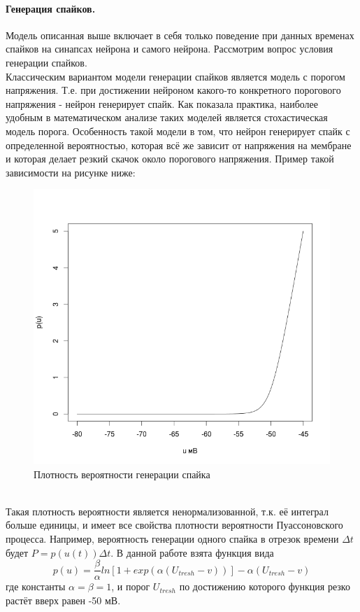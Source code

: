 \documentclass[a4paper,10pt]{article}
\begin{document}
\paragraph*{Генерация спайков.} Модель описанная выше включает в себя только поведение при данных временах спайков на синапсах нейрона и самого нейрона. Рассмотрим вопрос условия генерации спайков.\\
\indent Классическим вариантом модели генерации спайков является модель с порогом напряжения. Т.е. при достижении нейроном какого-то конкретного порогового напряжения - нейрон генерирует спайк. Как показала практика, наиболее удобным в математическом анализе таких моделей является стохастическая модель порога. Особенность такой модели в том, что нейрон генерирует спайк с определенной вероятностью, которая всё же зависит от напряжения на мембране и которая делает резкий скачок около порогового напряжения. Пример такой зависимости на рисунке ниже:
\begin{figure}[ht]\label{pic:p_srm}
\centering
\includegraphics[width=1\linewidth]{p_srm}
\caption{Плотность вероятности генерации спайка}
\end{figure} \\
\indent Такая плотность вероятности является ненормализованной, т.к. её интеграл больше единицы, и имеет все свойства плотности вероятности Пуассоновского процесса. Например, вероятность генерации одного спайка в отрезок времени $\Delta t$ будет $P = p(u(t))\Delta t$. В данной работе взята функция вида
\begin{equation}\label{eq:p_dens}
p(u)=\frac{\beta}{\alpha}ln[1+exp(\alpha(U_{tresh}-v))]-\alpha(U_{tresh}-v)
\end{equation}
где константы $\alpha=\beta=1$, и порог $U_{tresh}$ по достижению которого функция резко растёт вверх равен -50 мВ.
\end{document}
